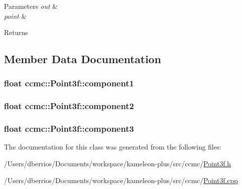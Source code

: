\begin{DoxyParams}{Parameters}
{\em out} & \\
\hline
{\em point} & \\
\hline
\end{DoxyParams}
\begin{DoxyReturn}{Returns}

\end{DoxyReturn}


\subsection{Member Data Documentation}
\hypertarget{classccmc_1_1_point3f_a3e9b0696019ec1577083dc8d2918ea46}{
\subsubsection[{component1}]{\setlength{\rightskip}{0pt plus 5cm}float ccmc\-::\-Point3f\-::component1}}\label{classccmc_1_1_point3f_a3e9b0696019ec1577083dc8d2918ea46}
\hypertarget{classccmc_1_1_point3f_adc52014c3135cbf699d7785e901e18a3}{
\subsubsection[{component2}]{\setlength{\rightskip}{0pt plus 5cm}float ccmc\-::\-Point3f\-::component2}}\label{classccmc_1_1_point3f_adc52014c3135cbf699d7785e901e18a3}
\hypertarget{classccmc_1_1_point3f_a9f6adb1d63a8d54913c30e1b62b118fd}{
\subsubsection[{component3}]{\setlength{\rightskip}{0pt plus 5cm}float ccmc\-::\-Point3f\-::component3}}\label{classccmc_1_1_point3f_a9f6adb1d63a8d54913c30e1b62b118fd}


The documentation for this class was generated from the following files\-:\begin{DoxyCompactItemize}
\item 
/\-Users/dberrios/\-Documents/workspace/kameleon-\/plus/src/ccmc/\hyperlink{_point3f_8h}{Point3f.\-h}\item 
/\-Users/dberrios/\-Documents/workspace/kameleon-\/plus/src/ccmc/\hyperlink{_point3f_8cpp}{Point3f.\-cpp}\end{DoxyCompactItemize}
